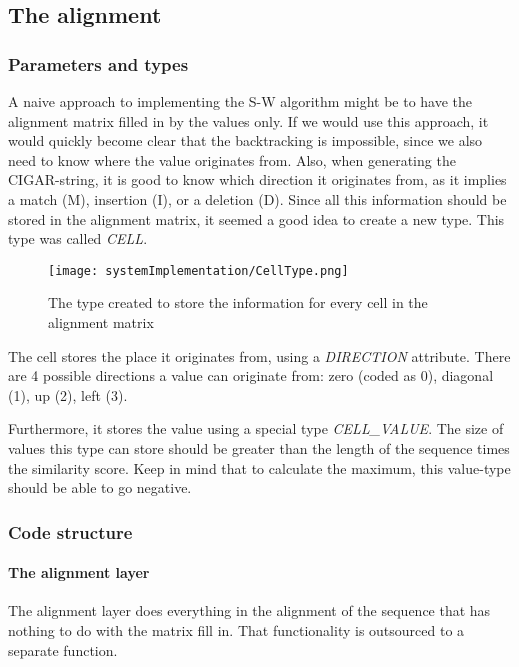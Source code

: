 \subsection{The alignment}
\label{expl:alignment}

\subsubsection{Parameters and types}
\label{expl:AlignmentParams}

A naive approach to implementing the S-W algorithm might be to have the alignment matrix filled in by the values only. If we would use this approach, it would quickly become clear that the backtracking is impossible, since we also need to know where the value originates from. Also, when generating the CIGAR-string, it is good to know which direction it originates from, as it implies a match (M), insertion (I), or a deletion (D). Since all this information should be stored in the alignment matrix, it seemed a good idea to create a new type. This type was called \emph{CELL}.

\begin{figure}[H]
	\centering
	\texttt{[image: systemImplementation/CellType.png]}
	\caption{The type created to store the information for every cell in the alignment matrix}
	\label{fig:CellType}
\end{figure}

The cell stores the place it originates from, using a \emph{DIRECTION} attribute. There are 4 possible directions a value can originate from: zero (coded as 0), diagonal (1), up (2), left (3).

Furthermore, it stores the value using a special type \emph{CELL\_VALUE}. The size of values this type can store should be greater than the length of the sequence times the similarity score. Keep in mind that to calculate the maximum, this value-type should be able to go negative.

\subsubsection{Code structure}

\paragraph{The alignment layer}

The alignment layer does everything in the alignment of the sequence that has nothing to do with the matrix fill in. That functionality is outsourced to a separate function.

